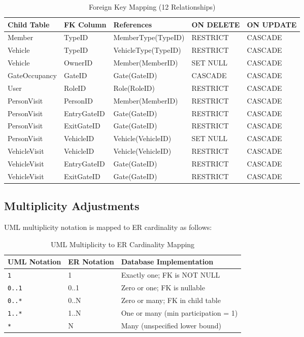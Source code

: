 \documentclass[a4paper, 12pt]{article}
\begin{document}
\begin{table}[H]
\centering
\caption{Foreign Key Mapping (12 Relationships)}
\label{tab:fk-mapping}
\small
\begin{tabularx}{\textwidth}{l l l l l}
\toprule
\textbf{Child Table} & \textbf{FK Column} & \textbf{References} & \textbf{ON DELETE} & \textbf{ON UPDATE} \\
\midrule
Member & TypeID & MemberType(TypeID) & RESTRICT & CASCADE \\
Vehicle & TypeID & VehicleType(TypeID) & RESTRICT & CASCADE \\
Vehicle & OwnerID & Member(MemberID) & SET NULL & CASCADE \\
GateOccupancy & GateID & Gate(GateID) & CASCADE & CASCADE \\
User & RoleID & Role(RoleID) & RESTRICT & CASCADE \\
PersonVisit & PersonID & Member(MemberID) & RESTRICT & CASCADE \\
PersonVisit & EntryGateID & Gate(GateID) & RESTRICT & CASCADE \\
PersonVisit & ExitGateID & Gate(GateID) & RESTRICT & CASCADE \\
PersonVisit & VehicleID & Vehicle(VehicleID) & SET NULL & CASCADE \\
VehicleVisit & VehicleID & Vehicle(VehicleID) & RESTRICT & CASCADE \\
VehicleVisit & EntryGateID & Gate(GateID) & RESTRICT & CASCADE \\
VehicleVisit & ExitGateID & Gate(GateID) & RESTRICT & CASCADE \\
\bottomrule
\end{tabularx}
\end{table}

\subsection{Multiplicity Adjustments}

UML multiplicity notation is mapped to ER cardinality as follows:

\begin{table}[H]
\centering
\caption{UML Multiplicity to ER Cardinality Mapping}
\label{tab:multiplicity}
\begin{tabularx}{\textwidth}{l l X}
\toprule
\textbf{UML Notation} & \textbf{ER Notation} & \textbf{Database Implementation} \\
\midrule
\texttt{1} & 1 & Exactly one; FK is NOT NULL \\
\texttt{0..1} & 0..1 & Zero or one; FK is nullable \\
\texttt{0..*} & 0..N & Zero or many; FK in child table \\
\texttt{1..*} & 1..N & One or many (min participation = 1) \\
\texttt{*} & N & Many (unspecified lower bound) \\
\bottomrule
\end{tabularx}
\end{table}
\end{document}
